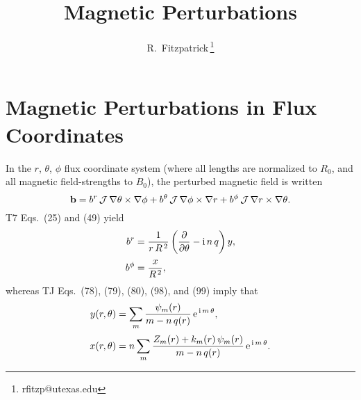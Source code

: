 \documentclass[12pt,prb,aps,notitlepage]{revtex4-1}
\begin{document}
\title{Magnetic Perturbations}
\author{R.~Fitzpatrick\,\footnote{rfitzp@utexas.edu}}
\begin{abstract}
\end{abstract}
\maketitle

\section{Magnetic Perturbations in Flux Coordinates}
In the $r$, $\theta$, $\phi$ flux coordinate system (where all lengths are normalized to $R_0$, and all magnetic field-strengths to $B_0$), the perturbed magnetic
field is written
\begin{equation}
{\bf b} = b^r\,{\cal J}\,\nabla\theta\times \nabla\phi + b^\theta\,{\cal J}\,\nabla\phi\times\nabla r + b^\phi\,{\cal J}\,\nabla r\times\nabla \theta.
\end{equation}
 T7 Eqs.~(25) and (49) yield
\begin{align}
b^r &=\frac{1}{r\,R^{\,2}}\left(\frac{\partial}{\partial\theta} - {\rm i}\,n\,q\right)y,\\[0.5ex]
b^\phi &= \frac{x}{R^{\,2}},
\end{align}
whereas TJ  Eqs.~(78), (79), (80), (98), and (99) imply that
\begin{align}
y(r,\theta) &= \sum_m\frac{\psi_m(r)}{m-n\,q(r)}\,{\rm e}^{\,{\rm i}\,m\,\theta},\\[0.5ex]
x(r,\theta)&= n\sum_m \frac{Z_m(r)+ k_m(r)\,\psi_m(r)}{m-n\,q(r)}\,{\rm e}^{\,{\rm i}\,m\,\theta}. 
\end{align}
\end{document}
